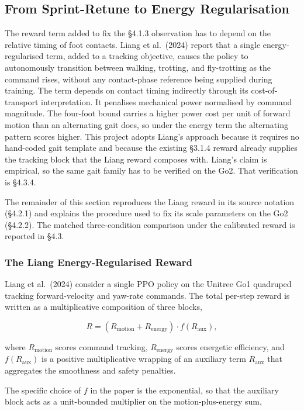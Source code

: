 \subsection{From Sprint-Retune to Energy Regularisation}

The reward term added to fix the \S4.1.3 observation has to depend on the relative timing of foot contacts. Liang et al.\ (2024) report that a single energy-regularised term, added to a tracking objective, causes the policy to autonomously transition between walking, trotting, and fly-trotting as the command rises, without any contact-phase reference being supplied during training. The term depends on contact timing indirectly through its cost-of-transport interpretation. It penalises mechanical power normalised by command magnitude. The four-foot bound carries a higher power cost per unit of forward motion than an alternating gait does, so under the energy term the alternating pattern scores higher. This project adopts Liang's approach because it requires no hand-coded gait template and because the existing \S3.1.4 reward already supplies the tracking block that the Liang reward composes with. Liang's claim is empirical, so the same gait family has to be verified on the Go2. That verification is \S4.3.4.

The remainder of this section reproduces the Liang reward in its source notation (\S4.2.1) and explains the procedure used to fix its scale parameters on the Go2 (\S4.2.2). The matched three-condition comparison under the calibrated reward is reported in \S4.3.

\subsubsection{The Liang Energy-Regularised Reward}

Liang et al.\ (2024) consider a single PPO policy on the Unitree Go1 quadruped tracking forward-velocity and yaw-rate commands. The total per-step reward is written as a multiplicative composition of three blocks,

\[
R = (R_{\mathrm{motion}} + R_{\mathrm{energy}}) \cdot f(R_{\mathrm{aux}}), \tag{1}
\]

where $R_{\mathrm{motion}}$ scores command tracking, $R_{\mathrm{energy}}$ scores energetic efficiency, and $f(R_{\mathrm{aux}})$ is a positive multiplicative wrapping of an auxiliary term $R_{\mathrm{aux}}$ that aggregates the smoothness and safety penalties.

The specific choice of $f$ in the paper is the exponential, so that the auxiliary block acts as a unit-bounded multiplier on the motion-plus-energy sum,

